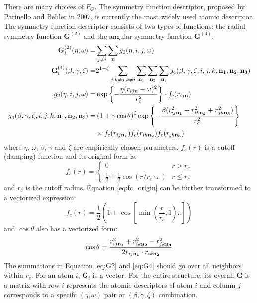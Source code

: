 \documentclass[preprint]{revtex4-2}
\begin{document}
There are many choices of $F_G$. The symmetry function descriptor, proposed 
by Parinello and Behler in 2007\cite{Behler}, is currently the most widely used 
atomic descriptor. The symmetry function descriptor consists of two types of 
functions: the radial symmetry function $\mathbf{G}^{(2)}$ and the angular 
symmetry function $\mathbf{G}^{(4)}$:
\begin{align}
\label{eq:G2}
\mathbf{G}^{(2)}_i(\eta, \omega) = & \sum_{j \neq i}{
    \sum_{\mathbf{n}}{g_2 (\eta, i, j, \omega)}
} \\
\label{eq:G4}
\mathbf{G}^{(4)}_i(\beta, \gamma, \zeta) 
= & 2^{1-\zeta}\sum_{j, k\neq j, k\neq i}{
    \sum_{\mathbf{n}_1}{\sum_{\mathbf{n}_2}{\sum_{\mathbf{n}_3}{
        g_4(\beta, \gamma, \zeta, 
          i, j, k, 
          \mathbf{n}_1, \mathbf{n}_2, \mathbf{n}_3)
    }}}
} \\
\label{eq:g2}
g_2(\eta, i, j, \omega) = 
& \exp\left\{-\frac{\eta(r_{ij\mathbf{n}} - \omega)^2}{r_c^2} \right\} \cdot f_c(r_{ij\mathbf{n}}) \\
\label{eq:g4}
g_4(
    \beta, \gamma, \zeta, 
    i, j, k, 
    \mathbf{n}_1, \mathbf{n}_2, \mathbf{n}_3) = & 
\left( 1 + \gamma\cos\theta \right)^\zeta 
    \exp \left\{ -\frac{\beta(r_{ij\mathbf{n_1}}^2 + r_{ik\mathbf{n_2}}^2 + r_{jk\mathbf{n_3}}^2)}{r_c^2} \right\}
\nonumber \\
& \times f_c(r_{ij\mathbf{n_1}})f_c(r_{ik\mathbf{n_2}})f_c(r_{jk\mathbf{n_3}})
\end{align}
where $\eta$, $\omega$, $\beta$, $\gamma$ and $\zeta$ are empirically chosen 
parameters, $f_c(r)$ is a cutoff (damping) function and its original form is:
\begin{equation}
\label{eq:fc_origin}
f_c(r) =
    \begin{cases}
    0 & \text{$r > r_c$} \\
    \frac{1}{2} + \frac{1}{2}\cos\left(r / r_c \cdot \pi \right) & 
    \text{$r \leq r_c$}
    \end{cases}
\end{equation}
and $r_c$ is the cutoff radius. Equation \eqref{eq:fc_origin} can be further 
transformed to a vectorized expression:
\begin{equation}
\label{eq:fc}
f_c(r) = \frac{1}{2}\left( 
    1 + \cos\left[ \min(\frac{r}{r_c}, 1) \pi \right] 
\right)
\end{equation} 
and $\cos\theta$ also has a vectorized form:
\begin{equation}
\cos\theta = \frac{r_{ij\mathbf{n_1}}^2 + r_{ik\mathbf{n_2}}^2 - r_{jk\mathbf{n_3}}^2}{2 r_{ij\mathbf{n_1}} \cdot r_{ik\mathbf{n_2}}}
\end{equation}
The summations in Equation \ref{eq:G2} and \ref{eq:G4} should go over all 
neighbors within $r_c$. For an atom $i$, $\mathbf{G}_i$ is a vector. For the 
entire structure, its overall $\mathbf{G}$ is a matrix with row $i$ represents 
the atomic descriptors of atom $i$ and column $j$ corresponds to a specifc 
$(\eta, \omega)$ pair or $(\beta, \gamma, \zeta)$ combination.
\end{document}
